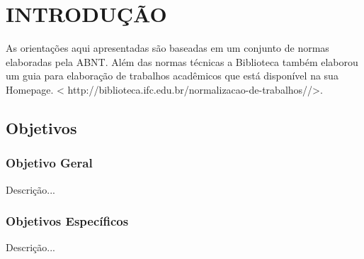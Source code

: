 \chapter{INTRODUÇÃO}

As orientações aqui apresentadas são baseadas em um conjunto de normas elaboradas pela ABNT. Além das normas técnicas a Biblioteca também elaborou  um guia para elaboração de trabalhos acadêmicos que está disponível na sua Homepage. < http://biblioteca.ifc.edu.br/normalizacao-de-trabalhos//>. 

\section{Objetivos}

\subsection{Objetivo Geral}
	
Descrição...

\subsection{Objetivos Específicos} 

Descrição...

% 
%